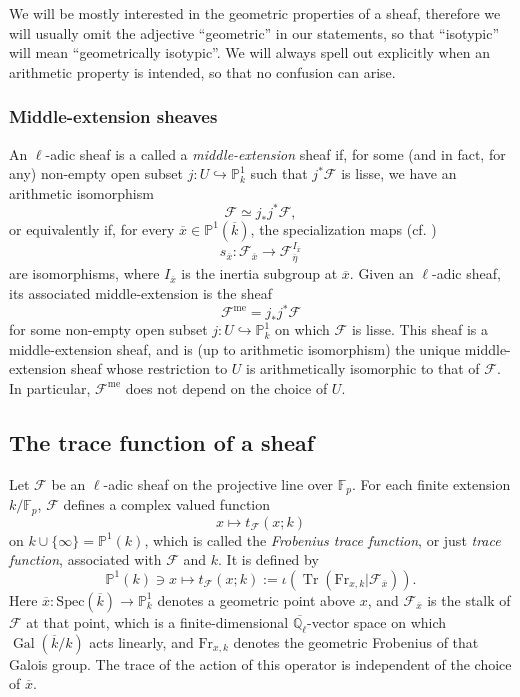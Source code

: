 \documentclass[12pt,a4paper,reqno]{amsart}
\numberwithin{equation}{section}
\DeclareMathOperator*\Gal{Gal}
\theoremstyle{plain}
\theoremstyle{definition}
\newcommand\F{\mathbb{F}}
\newcommand\C{\mathbb{C}}
\newcommand\Q{\mathbb{Q}}
\newcommand\Fr{\mathrm{Fr}}
\newcommand\ov{\overline}
\newcommand\mcF{\mathcal{F}}
\newcommand\Pl{\mathbb{P}^1}
\DeclareMathOperator{\Tr}{Tr}
\newcommand\Fp{\F_{p}}
\begin{document}
We will be mostly interested in the geometric properties of a sheaf,
therefore we will usually omit the adjective ``geometric'' in our
statements, so that ``isotypic'' will mean ``geometrically
isotypic''. We will always spell out explicitly when an arithmetic
property is intended, so that no confusion can arise.

\subsubsection{Middle-extension sheaves} 
An $\ell$-adic sheaf is a called a \emph{middle-extension} sheaf if,
for some (and in fact, for any) non-empty open subset
$j:U\hookrightarrow \mathbb{P}_k^1$ such that $j^*\mcF$ is lisse, we
have an arithmetic isomorphism
$$
\mcF\simeq j_*j^*\mcF,
$$
or equivalently if, for every $\ov x\in\Pl(\ov k)$, the
specialization maps (cf. \cite[4.4]{katz-sommes}) 
$$
s_{\ov x}:\mcF_{\ov x}\rightarrow \mcF_{\ov \eta}^{I_{\ov x}}
$$ 
are isomorphisms, where $I_{\ov{x}}$ is the inertia subgroup at
$\ov{x}$. Given an $\ell$-adic sheaf, its associated middle-extension
is the sheaf
$$
\mcF^{\mathrm{me}}=j_*j^*\mcF
$$
for some non-empty open subset $j:U\hookrightarrow \mathbb{P}_k^1$ on
which $\mcF$ is lisse. This sheaf is a middle-extension sheaf, and is
(up to arithmetic isomorphism) the unique middle-extension sheaf whose
restriction to $U$ is arithmetically isomorphic to that of $\mcF$. In
particular, $\mcF^{\mathrm{me}}$ does not depend on the choice of $U$.

\subsection{The trace function of a sheaf}
Let $\mcF$ be an $\ell$-adic sheaf on the projective line over
$\Fp$. For each finite extension $k/\Fp$, $\mcF$ defines a complex
valued function
$$
x \mapsto t_{\mcF}(x;k)
$$ 
on $k\cup\{\infty\}=\Pl(k)$, which is called the \emph{Frobenius trace function}, or
just \emph{trace function}, associated with $\mcF$ and $k$. It is
defined by
$$
\Pl(k) \ni x\mapsto t_{\mcF}(x;k):=\iota(\Tr(\Fr_{x,k}|\mcF_{\overline
  x})).
$$
Here $\ov x:\mathrm{Spec}(\ov k)\rightarrow \Pl_k$ denotes a geometric
point above $x$, and $\mcF_{\overline x}$ is the stalk of $\mcF$ at
that point, which is a finite-dimensional $\ov{\Q_\ell}$-vector space
on which $\Gal(\ov k/k)$ acts linearly, and $\Fr_{x,k}$ denotes the
geometric Frobenius of that Galois group. The trace of the action of
this operator is independent of the choice of $\ov{x}$.
\end{document}
